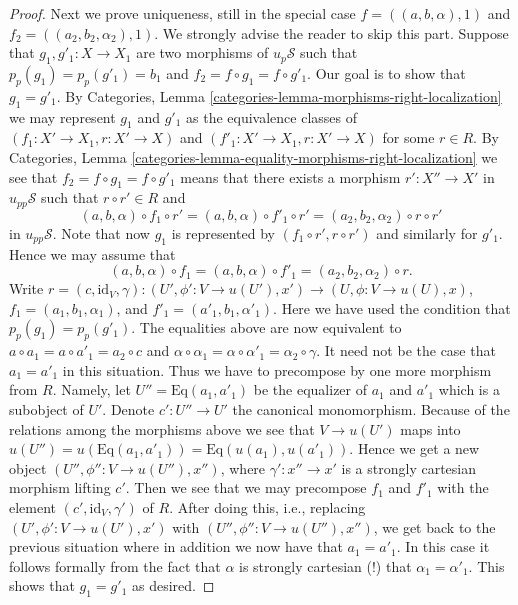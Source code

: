 \begin{proof}
\medskip\noindent
Next we prove uniqueness, still in the special case
$f = ((a, b, \alpha), 1)$ and $f_2 = ((a_2, b_2, \alpha_2), 1)$.
We strongly advise the reader to skip this part.
Suppose that $g_1, g'_1 : X \to X_1$ are two morphisms of
$u_p\mathcal{S}$ such that $p_p(g_1) = p_p(g'_1) = b_1$ and
$f_2 = f \circ g_1 = f \circ g'_1$. Our goal is to show that
$g_1 = g'_1$. By
Categories, Lemma \ref{categories-lemma-morphisms-right-localization}
we may represent $g_1$ and $g'_1$ as the equivalence classes of
$(f_1 : X' \to X_1, r : X' \to X)$ and
$(f'_1 : X' \to X_1, r : X' \to X)$ for some $r \in R$. By
Categories, Lemma \ref{categories-lemma-equality-morphisms-right-localization}
we see that $f_2 = f \circ g_1 = f \circ g'_1$ means that there
exists a morphism $r' : X'' \to X'$ in $u_{pp}\mathcal{S}$ such that
$r \circ r' \in R$ and
$$
(a, b, \alpha) \circ f_1 \circ r' =
(a, b, \alpha) \circ f'_1 \circ r' =
(a_2, b_2, \alpha_2) \circ r \circ r'
$$
in $u_{pp}\mathcal{S}$. Note that
now $g_1$ is represented by $(f_1 \circ r', r \circ r')$ and
similarly for $g'_1$. Hence we may assume that
$$
(a, b, \alpha) \circ f_1 =
(a, b, \alpha) \circ f'_1 =
(a_2, b_2, \alpha_2) \circ r.
$$
Write $r = (c, \text{id}_V, \gamma) : (U', \phi' : V \to u(U'), x')
\to (U, \phi : V \to u(U), x)$,
$f_1 = (a_1, b_1, \alpha_1)$, and $f'_1 = (a'_1, b_1, \alpha'_1)$.
Here we have used the condition that $p_p(g_1) = p_p(g'_1)$.
The equalities above are now equivalent to
$a \circ a_1 = a \circ a'_1 = a_2 \circ c$ and
$\alpha \circ \alpha_1 = \alpha \circ \alpha'_1 = \alpha_2 \circ \gamma$.
It need not be the case that $a_1 = a'_1$ in this situation.
Thus we have to precompose by one more morphism from $R$.
Namely, let $U'' = \text{Eq}(a_1, a'_1)$ be the equalizer of
$a_1$ and $a'_1$ which is a subobject of $U'$. Denote
$c' : U'' \to U'$ the canonical monomorphism.
Because of the relations among the morphisms
above we see that $V \to u(U')$ maps into
$u(U'') = u(\text{Eq}(a_1, a'_1)) = \text{Eq}(u(a_1), u(a'_1))$.
Hence we get a new object $(U'', \phi'' : V \to u(U''), x'')$, where
$\gamma' : x'' \to x'$ is a strongly cartesian morphism lifting $c'$.
Then we see that we may precompose $f_1$ and $f'_1$ with the element
$(c', \text{id}_V, \gamma')$ of $R$. After doing this, i.e., replacing
$(U', \phi' : V \to u(U'), x')$ with
$(U'', \phi'' : V \to u(U''), x'')$, we get back to the previous
situation where in addition we now have that $a_1 = a'_1$.
In this case it follows formally from the fact that $\alpha$
is strongly cartesian (!) that $\alpha_1 = \alpha'_1$.
This shows that $g_1 = g'_1$ as desired.


\end{proof}
